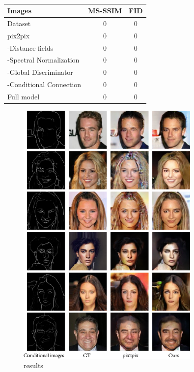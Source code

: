 %
%
\begin{table}[h]
	\centering	
	\caption{ }
	\begin{tabular}{|l|c|c|}\hline
		Images & MS-SSIM & FID\\\hline
		Dataset & $0$ & $0$\\
		pix2pix & $0$ & $0$ \\
		-Distance fields & $0$ & $0$\\
		-Spectral Normalization & $0$ & $0$\\
		-Global Discriminator & $0$ & $0$ \\
		-Conditional Connection & $0$ & $0$ \\
		Full model & $0$ & $0$ \\\hline
	\end{tabular}
	\label{tab:evaluation_metrics}
\end{table}
%
%
\begin{figure}
	\includegraphics[width=0.8\textwidth]{figures/results}
	\caption{results}
	\label{fig:results}
\end{figure}
%
%
